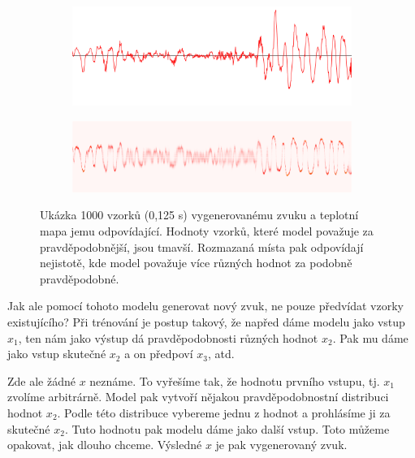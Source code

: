 \documentclass[a4]{article}
\begin{document}
\begin{figure}[h]
\centering
\begin{subfigure}{.5\textwidth}
\centering
\includegraphics[width=0.9\linewidth]{waveform_1}
\end{subfigure}%
\begin{subfigure}{.5\textwidth}
\centering
\includegraphics[width=0.9\linewidth]{heatmap_1_v2}
\end{subfigure}
\caption{Ukázka 1000 vzorků (0,125 s) vygenerovanému zvuku a teplotní mapa jemu odpovídající. Hodnoty vzorků, které model považuje za pravděpodobnější, jsou tmavší. Rozmazaná místa pak odpovídají nejistotě, kde model považuje více různých hodnot za podobně pravděpodobné. \protect \footnotemark}
\end{figure}


Jak ale pomocí tohoto modelu generovat nový zvuk, ne pouze předvídat vzorky existujícího? Při trénování je postup takový, že napřed dáme modelu jako vstup $x_1$, ten nám jako výstup dá pravděpodobnosti různých hodnot $x_2$. Pak mu dáme jako vstup skutečné $x_2$ a on předpoví $x_3$, atd.

Zde ale žádné $x$ neznáme. To vyřešíme tak, že hodnotu prvního vstupu, tj. $x_1$ zvolíme arbitrárně. Model pak vytvoří nějakou pravděpodobnostní distribuci hodnot $x_2$. Podle této distribuce vybereme jednu z hodnot a prohlásíme ji za skutečné $x_2$. Tuto hodnotu pak modelu dáme jako další vstup. Toto můžeme opakovat, jak dlouho chceme. Výsledné $x$ je pak vygenerovaný zvuk.
\end{document}
